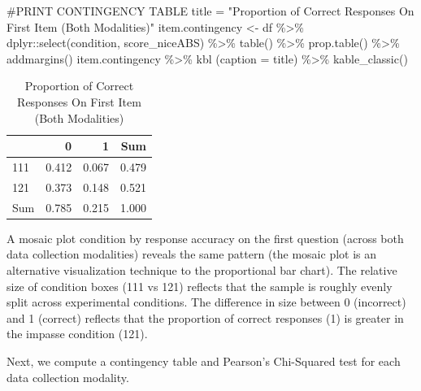 \documentclass[
  letterpaper,
  DIV=11,
  numbers=noendperiod]{scrreprt}
\newenvironment{Shaded}{\begin{snugshade}}{\end{snugshade}}
\newcommand{\AttributeTok}[1]{\textcolor[rgb]{0.40,0.45,0.13}{#1}}
\newcommand{\CommentTok}[1]{\textcolor[rgb]{0.37,0.37,0.37}{#1}}
\newcommand{\FunctionTok}[1]{\textcolor[rgb]{0.28,0.35,0.67}{#1}}
\newcommand{\NormalTok}[1]{\textcolor[rgb]{0.00,0.23,0.31}{#1}}
\newcommand{\OtherTok}[1]{\textcolor[rgb]{0.00,0.23,0.31}{#1}}
\newcommand{\SpecialCharTok}[1]{\textcolor[rgb]{0.37,0.37,0.37}{#1}}
\newcommand{\StringTok}[1]{\textcolor[rgb]{0.13,0.47,0.30}{#1}}
\begin{document}
\begin{Shaded}
\begin{Highlighting}[]
\CommentTok{\#PRINT CONTINGENCY TABLE}
\NormalTok{title }\OtherTok{=} \StringTok{"Proportion of Correct Responses On First Item (Both Modalities)"}
\NormalTok{item.contingency }\OtherTok{\textless{}{-}}\NormalTok{  df }\SpecialCharTok{\%\textgreater{}\%}\NormalTok{ dplyr}\SpecialCharTok{::}\FunctionTok{select}\NormalTok{(condition, score\_niceABS) }\SpecialCharTok{\%\textgreater{}\%} \FunctionTok{table}\NormalTok{() }\SpecialCharTok{\%\textgreater{}\%} \FunctionTok{prop.table}\NormalTok{() }\SpecialCharTok{\%\textgreater{}\%} \FunctionTok{addmargins}\NormalTok{()}
\NormalTok{item.contingency }\SpecialCharTok{\%\textgreater{}\%} \FunctionTok{kbl}\NormalTok{ (}\AttributeTok{caption =}\NormalTok{ title) }\SpecialCharTok{\%\textgreater{}\%} \FunctionTok{kable\_classic}\NormalTok{()}
\end{Highlighting}
\end{Shaded}

\begin{table}

\caption{Proportion of Correct Responses On First Item (Both Modalities)}
\centering
\begin{tabular}[t]{l|r|r|r}
\hline
  & 0 & 1 & Sum\\
\hline
111 & 0.412 & 0.067 & 0.479\\
\hline
121 & 0.373 & 0.148 & 0.521\\
\hline
Sum & 0.785 & 0.215 & 1.000\\
\hline
\end{tabular}
\end{table}

A mosaic plot condition by response accuracy on the first question
(across both data collection modalities) reveals the same pattern (the
mosaic plot is an alternative visualization technique to the
proportional bar chart). The relative size of condition boxes (111 vs
121) reflects that the sample is roughly evenly split across
experimental conditions. The difference in size between 0 (incorrect)
and 1 (correct) reflects that the proportion of correct responses (1) is
greater in the impasse condition (121).

Next, we compute a contingency table and Pearson's Chi-Squared test for
each data collection modality.
\end{document}
